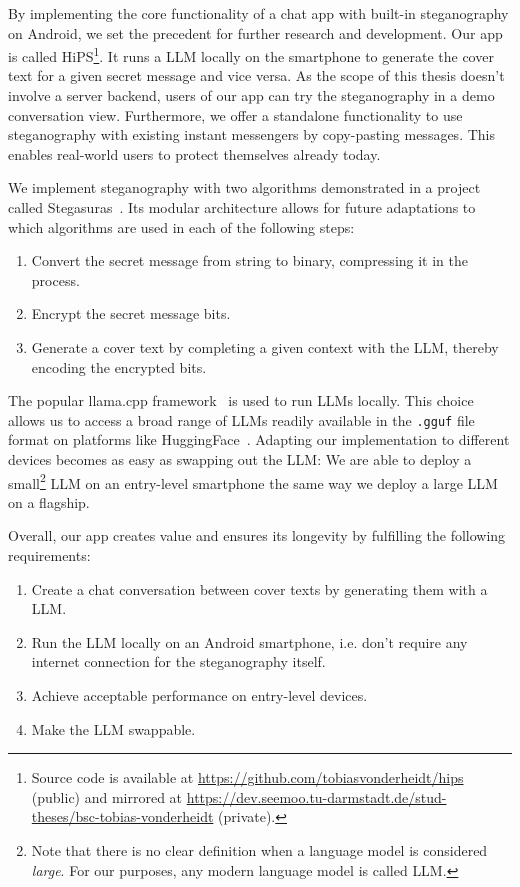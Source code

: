 By implementing the core functionality of a chat app with built-in steganography on Android, we set the precedent for further research and development. Our app is called \gls{HiPS}\footnote{Source code is available at \url{https://github.com/tobiasvonderheidt/hips} (public) and mirrored at \url{https://dev.seemoo.tu-darmstadt.de/stud-theses/bsc-tobias-vonderheidt} (private).}. It runs a \gls{LLM} locally on the smartphone to generate the cover text for a given secret message and vice versa. As the scope of this thesis doesn't involve a server backend, users of our app can try the steganography in a demo conversation view. Furthermore, we offer a standalone functionality to use steganography with existing instant messengers by copy-pasting messages. This enables real-world users to protect themselves already today.

We implement steganography with two algorithms demonstrated in a project called Stegasuras~\cite{zieglerNeuralLinguisticSteganography2019}. Its modular architecture allows for future adaptations to which algorithms are used in each of the following steps:

\begin{enumerate}
    \item Convert the secret message from string to binary, compressing it in the process.
    \item Encrypt the secret message bits.
    \item Generate a cover text by completing a given context with the \gls{LLM}, thereby encoding the encrypted bits.
\end{enumerate}

The popular llama.cpp framework~\cite{gerganovGgerganovLlamacpp2024} is used to run \glspl{LLM} locally. This choice allows us to access a broad range of \glspl{LLM} readily available in the \lstinline|.gguf| file format on platforms like HuggingFace~\cite{huggingfaceModelsHuggingFace2025}. Adapting our implementation to different devices becomes as easy as swapping out the \gls{LLM}: We are able to deploy a small\footnote{Note that there is no clear definition when a language model is considered \textit{large}. For our purposes, any modern language model is called \gls{LLM}.} \gls{LLM} on an entry-level smartphone the same way we deploy a large \gls{LLM} on a flagship.

Overall, our app creates value and ensures its longevity by fulfilling the following requirements:

\begin{enumerate}
    \item Create a chat conversation between cover texts by generating them with a \gls{LLM}.
    \item Run the \gls{LLM} locally on an Android smartphone, i.e. don't require any internet connection for the steganography itself.
    \item Achieve acceptable performance on entry-level devices.
    \item Make the \gls{LLM} swappable.
\end{enumerate}


